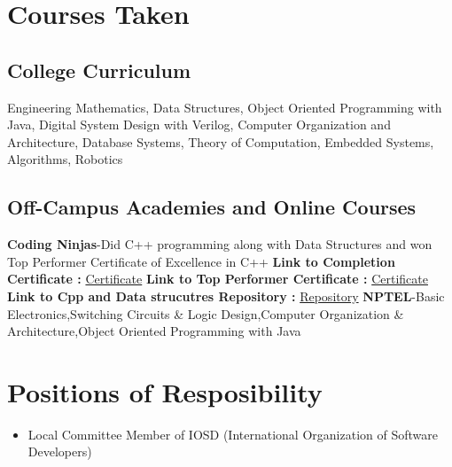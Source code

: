\documentclass[a4paper,12pt]{article}
\begin{document}
\section*{Courses Taken}
    \subsection*{College Curriculum}
    Engineering Mathematics, 
    Data Structures,
    Object Oriented Programming with Java,
    Digital System Design with Verilog,
    Computer Organization and Architecture,
    Database Systems,
    Theory of Computation,
    Embedded Systems,
    Algorithms,
    Robotics 
    \subsection*{Off-Campus Academies and Online Courses}
    \textbf{Coding Ninjas}-Did C++ programming along with Data Structures 
    and won Top Performer Certificate of Excellence in C++
    \newline
    \textbf{Link to Completion Certificate :} \href{https://github.com/teetangh/Kaustav-All-Certifications/blob/master/Programming/Coding%20Ninjas/Coding%20Ninjas%20Cpp%20Completion%20Certificate.pdf}{Certificate}
    \newline
    \textbf{Link to Top Performer Certificate :} \href{https://github.com/teetangh/Kaustav-All-Certifications/blob/master/Programming/Coding%20Ninjas/Coding%20Ninjas%20Cpp%20Top%20Performer%20Certificate.pdf}{Certificate}
    \newline
    \textbf{Link to Cpp and Data strucutres Repository :} \href{https://github.com/teetangh/Kaustav-Competitive-Coding}{Repository}
    \newline
    \textbf{NPTEL}-Basic Electronics,Switching Circuits \& Logic Design,Computer Organization \& Architecture,Object Oriented Programming with Java
    
\section*{Positions of Resposibility}
    \begin{itemize}
        \item Local Committee Member of IOSD
        (International Organization of Software Developers)
    \end{itemize}
\end{document}
